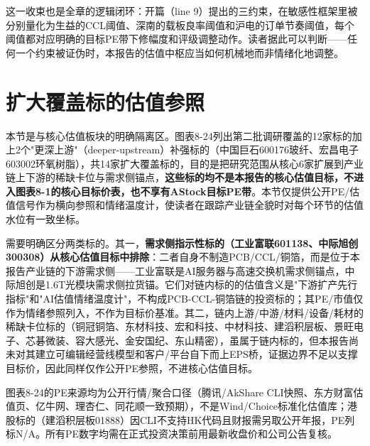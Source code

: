 这一收束也是全章的逻辑闭环：开篇（line 9）提出的三约束，在敏感性框架里被分别量化为生益的CCL阈值、深南的载板良率阈值和沪电的订单节奏阈值，每个阈值都对应明确的目标PE带下修幅度和评级调整动作。读者据此可以判断——任何一个约束被证伪时，本报告的估值中枢应当如何机械地而非情绪化地调整。

\section{扩大覆盖标的估值参照}

本节是与核心估值板块的明确隔离区。图表8-24列出第二批调研覆盖的12家标的加上2个"更深上游"（deeper-upstream）补强标的（中国巨石600176玻纤、宏昌电子603002环氧树脂），共14家扩大覆盖标的，目的是把研究范围从核心6家扩展到产业链上下游的稀缺卡位与需求侧锚点，\textbf{这些标的均不是本报告的核心估值目标，不进入图表8-1的核心目标价表，也不享有AStock目标PE带}。本节仅提供公开PE/估值信号作为横向参照和情绪温度计，使读者在跟踪产业链全貌时对每个环节的估值水位有一致坐标。

需要明确区分两类标的。其一，\textbf{需求侧指示性标的（工业富联601138、中际旭创300308）从核心估值目标中排除}：二者自身不制造PCB/CCL/铜箔，而是位于本报告产业链的下游需求侧——工业富联是AI服务器与高速交换机需求侧锚点，中际旭创是1.6T光模块需求侧拉货锚。它们对链内标的的估值含义是"下游扩产先行指标"和"AI估值情绪温度计"，不构成PCB-CCL-铜箔链的投资标的；其PE/市值仅作为情绪参照列入，不作为目标价基准。其二，链内上游/中游/材料/设备/耗材的稀缺卡位标的（铜冠铜箔、东材科技、宏和科技、中材科技、建滔积层板、景旺电子、芯碁微装、容大感光、金安国纪、东山精密），虽属于链内标的，但本报告尚未对其建立可编辑经营线模型和客户/平台自下而上EPS桥，证据边界不足以支撑目标价，因此同样仅作公开PE参照，不进核心估值目标。

图表8-24的PE来源均为公开行情/聚合口径（腾讯/AkShare CLI快照、东方财富估值页、亿牛网、理杏仁、同花顺一致预期），不是Wind/Choice标准化估值库；港股标的（建滔积层板01888）因CLI不支持HK代码且财报需另取公开年报，PE列标N/A。所有PE数字均需在正式投资决策前用最新收盘价和公司公告复核。


